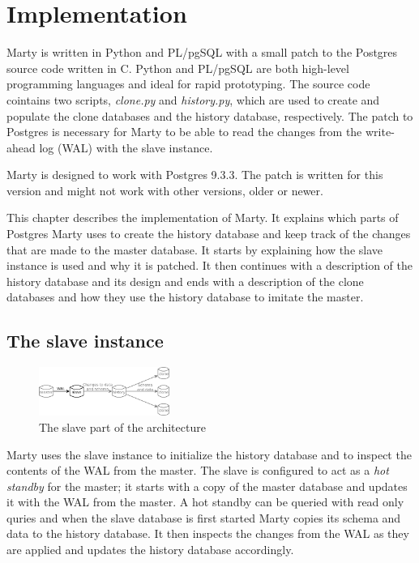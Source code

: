 \chapter{Implementation}
Marty is written in Python and PL/pgSQL with a small patch to the Postgres source code written in C.
Python and PL/pgSQL are both high-level programming languages and ideal for rapid prototyping.
The source code cointains two scripts, \textit{clone.py} and \textit{history.py}, which are used to create and populate the clone databases and the history database, respectively.
The patch to Postgres is necessary for Marty to be able to read the changes from the write-ahead log (WAL) with the slave instance.

Marty is designed to work with Postgres 9.3.3.
The patch is written for this version and might not work with other versions, older or newer.

This chapter describes the implementation of Marty.
It explains which parts of Postgres Marty uses to create the history database and keep track of the changes that are made to the master database.
It starts by explaining how the slave instance is used and why it is patched.
It then continues with a description of the history database and its design and ends with a description of the clone databases and how they use the history database to imitate the master.

\section{The slave instance}

\begin{figure}
  \vspace{-20pt}
  \begin{center}
    \includegraphics[width=0.38\textwidth]{img/architecture-slave}
  \end{center}
  \vspace{-20pt}
  \caption{The slave part of the architecture}
  \vspace{-10pt}
\end{figure}

Marty uses the slave instance to initialize the history database and to inspect the contents of the WAL from the master.
The slave is configured to act as a \textit{hot standby} for the master; it starts with a copy of the master database and updates it with the WAL from the master.
A hot standby can be queried with read only quries and when the slave database is first started Marty copies its schema and data to the history database.
It then inspects the changes from the WAL as they are applied and updates the history database accordingly.

